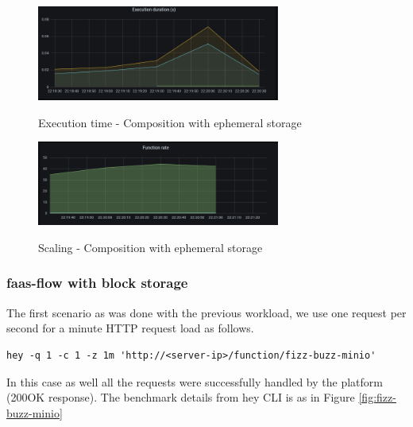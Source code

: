 \documentclass[12pt,titlepage]{article}
\begin{document}
\begin{figure}[!h]
    \caption{Execution time - Composition with ephemeral storage}
    \centering
    \includegraphics[width=80mm]{./thesis_images/exec_time.png}
    \label{fig:exec_time}
\end{figure}

\begin{figure}[!h]
    \caption{Scaling - Composition with ephemeral storage}
    \centering
    \includegraphics[width=80mm]{./thesis_images/function_rate.png}
    \label{fig:function_rate}
\end{figure}

\subsubsection{faas-flow with block storage}
\label{sec:org3546589}
The first scenario as was done with the previous workload, we use one request
per second for a minute HTTP request load as follows.
\begin{lstlisting}
hey -q 1 -c 1 -z 1m 'http://<server-ip>/function/fizz-buzz-minio'
\end{lstlisting}
In this case as well all the requests were successfully handled by the platform
(200OK response). The benchmark details from hey CLI is as in Figure \ref{fig:fizz-buzz-minio}
\end{document}
